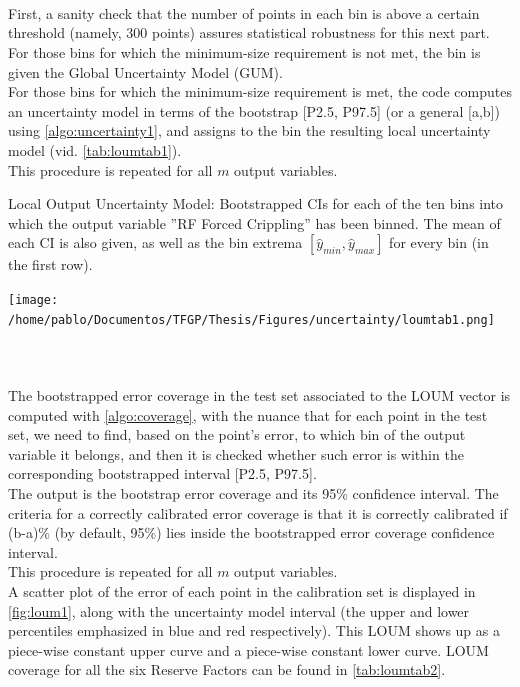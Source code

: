 \paragraph{ \\}
First, a sanity check that the number of points in each bin is above a certain threshold (namely, 300 points) assures statistical robustness for this next part.\\
\indent For those bins for which the minimum-size requirement is not met, the bin is given the Global Uncertainty Model (GUM).\\
\indent For those bins for which the minimum-size requirement is met, the code computes an uncertainty model in terms of the bootstrap [P2.5, P97.5] (or a general [a,b]) using \autoref{algo:uncertainty1}, and assigns to the bin the resulting local uncertainty model (vid. \autoref{tab:loumtab1}).\\
%
\indent This procedure is repeated for all $m$ output variables.
\begin{table}
	\centering
	\caption{Local Output Uncertainty Model: Bootstrapped CIs for each of the ten bins into which the output variable ''RF Forced Crippling'' has been binned. The mean of each CI is also given, as well as the bin extrema $[\hat{y}_{min},\hat{y}_{max}]$ for every bin (in the first row).}
	\texttt{[image: /home/pablo/Documentos/TFGP/Thesis/Figures/uncertainty/loumtab1.png]}
	\label{tab:loumtab1}
\end{table}

\paragraph{ \\}
The bootstrapped error coverage in the test set associated to the LOUM vector is computed with \autoref{algo:coverage}, with the nuance that for each point in the test set, we need to find, based on the point's error, to which bin of the output variable it belongs, and then it is checked whether such error is within the corresponding bootstrapped interval [P2.5, P97.5].\\
\indent The output is the bootstrap error coverage and its 95\% confidence interval. The criteria for a correctly calibrated error coverage is that it is correctly calibrated if (b-a)\% (by default, 95\%) lies inside the bootstrapped error coverage confidence interval.\\
\indent This procedure is repeated for all $m$ output variables.\\
\indent A scatter plot of the error of each point in the calibration set is displayed in \autoref{fig:loum1}, along with the uncertainty model interval (the upper and lower percentiles emphasized in blue and red respectively). This LOUM shows up as a piece-wise constant upper curve and a piece-wise constant lower curve. LOUM coverage for all the six Reserve Factors can be found in \autoref{tab:loumtab2}.\\

